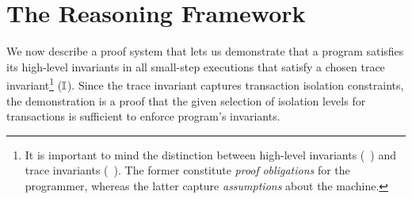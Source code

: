 \section{The Reasoning Framework}
\label{sec:reasoning}

We now describe a proof system that lets us demonstrate that a \txnimp
program satisfies its high-level invariants in all small-step
executions that satisfy a chosen trace invariant\footnote{It is
important to mind the distinction between high-level invariants
(\eg~) and trace invariants (\eg~). The former
constitute \emph{proof} \emph{obligations} for the programmer, whereas
the latter capture \emph{assumptions} about the machine. } ($\mathbb{I}$).
Since the trace invariant captures transaction isolation constraints,
the demonstration is a proof that the given selection of isolation
levels for transactions is sufficient to enforce program's invariants.

